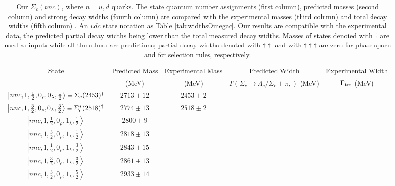 \documentclass[twocolumn,superscriptaddress,preprintnumbers,nofootinbib]{revtex4}
\begin{document}
\begin{table*}[htbp]
\caption{Our $\Sigma_c (nnc)$, where $n=u,d$ quarks. The state quantum number assignments (first column), predicted masses (second column) and strong decay widths (fourth column) are compared with the  experimental  masses (third column) and total decay widths (fifth column) \cite{Aaij:2017nav,Tanabashi:2018oca}. An $udc$ state notation as Table \ref {tab:widthsOmegac}. Our results are compatible with the experimental data, the predicted partial decay widths being lower than the total measured decay widths. Masses of states denoted  with $\dagger$ are used as inputs while all the others
are predictions; partial decay widths denoted with $\dagger  \dagger  $ and with  $\dagger  \dagger  \dagger $  are zero for phase space and for selection rules, respectively. }
\begin{tabular}{ccccc}
\hline
\hline
State & Predicted Mass & Experimental Mass & Predicted Width & Experimental Width\\
         & (MeV)                & (MeV)                      & $\Gamma(\Sigma_c \rightarrow \Lambda_c / \Sigma_c +\pi,)$ (MeV) &  $\Gamma_{\rm tot}$  (MeV) \\
\hline
$\left| nnc,1, \frac{1}{2},0_{\rho},0_{\lambda}, \frac{1}{2} \right\rangle \equiv \Sigma_{\rm c}(2453)^{\dagger}$   &  $2713 \pm 12$ & $2453\pm2$ &   &   \\
$\left| nnc,1, \frac{3}{2},0_{\rho},0_{\lambda}, \frac{3}{2} \right\rangle \equiv \Sigma_{\rm c}^{*}(2518)^{\dagger}$   & $2774\pm13$ &   $2518\pm2$ &  &  \\
$\left| nnc,1, \frac{1}{2},0_{\rho},1_{\lambda}, \frac{1}{2} \right\rangle $   &  $2800 \pm 9$ &  &  &  \\
$\left| nnc,1, \frac{3}{2},0_{\rho},1_{\lambda},  \frac{1}{2} \right\rangle $   &  $2818 \pm 13$   & &   & \\
$\left| nnc,1,  \frac{1}{2},0_{\rho},1_{\lambda}, \frac{3}{2} \right\rangle $  &  $2843 \pm 15$ &  &    &  \\
$\left| nnc,1, \frac{3}{2},0_{\rho},1_{\lambda}, \frac{3}{2} \right\rangle  $  & $2861\pm13$ &  &  &  \\
$\left| nnc,1, \frac{3}{2},0_{\rho},1_{\lambda}, \frac{5}{2} \right\rangle $  & $ 2933\pm14$ &  & &   \\

\end{tabular}
\end{table*}
\end{document}
